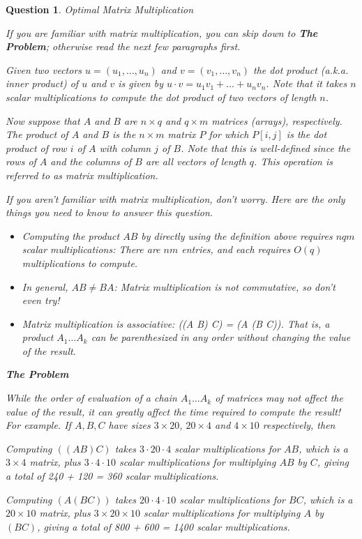\documentclass[10pt]{article}
\newtheorem{question}{Question}
\begin{document}
\begin{question}{Optimal Matrix Multiplication}

If you are familiar with matrix multiplication, you can skip down to \textbf{The Problem};
otherwise read the next few paragraphs first.

Given two vectors $u = (u_1, \ldots, u_n)$ and $v= (v_1, \ldots, v_n)$ the {\em dot product}
(a.k.a. {\em inner product}) of $u$ and $v$ is given by
$u \cdot v =  u_1 v_1 + \ldots + u_n v_n$.  Note that it takes $n$ scalar multiplications to compute the dot product of two vectors of length $n$.

Now suppose that $A$ and $B$ are $n \times q$ and $q \times m$ matrices (arrays), respectively.  The {\em product} of $A$ and $B$ is the $n \times m$ matrix $P$ for which $P[i,j]$  is the dot product of row $i$ of $A$ with column $j$ of $B$.  Note that this is well-defined since the rows of $A$ and the columns of $B$ are all vectors of length $q$.  This operation is referred to as {\em matrix multiplication}.

If you aren't familiar with matrix multiplication, don't worry.  Here are the only things you need to know to answer this question.
\begin{itemize}
\item Computing the product $A B$ by directly using the definition above requires $n q m$ scalar multiplications: There are $n m$ entries, and each requires $O(q)$ multiplications to compute.
\item In general, $A B \not= B A$: Matrix multiplication is {\em not} commutative, so don't even try!
\item Matrix multiplication is {\em associative}: ((A B) C) = (A (B C)).  That is, a product $A_1 \ldots A_k$ can be parenthesized in any order without changing the value of the result. 
\end{itemize}

\textbf{The Problem}

While the order of evaluation of a chain $A_1 \ldots A_k$ of matrices may not affect the value of the result, it can greatly affect the time required to compute the result!  For example.  If $A, B, C$ have sizes $3 \times 20$, $20 \times 4$ and $4 \times 10$ respectively, then 
\begin{description}
\item{Computing $((A B) C)$} takes $3 \cdot 20 \cdot 4$ scalar multiplications for $A B$, which is a $3 \times 4$ matrix, plus $3 \cdot 4 \cdot 10$ scalar multiplications for multiplying $A B$ by $C$, giving a total of 240 + 120 = 360 scalar multiplications.
\item{Computing $(A (B C))$} takes $20 \cdot 4 \cdot 10$ scalar multiplications for $B C$, which is a $20 \times 10$
matrix, plus $3 \times 20 \times 10$ scalar multiplications for multiplying $A$ by  $(B C)$, giving a total of 800 + 600 = 1400 scalar multiplications.
\end{description}


\end{question}
\end{document}

